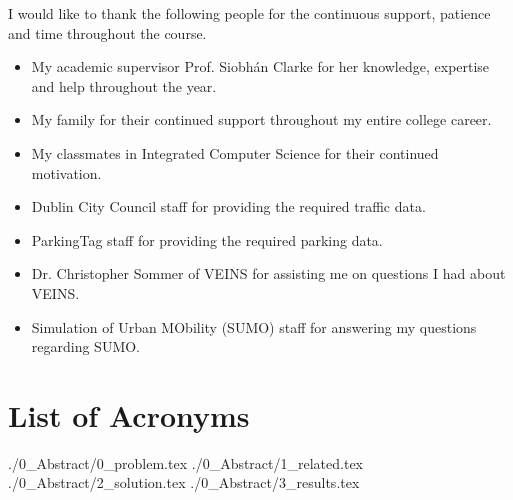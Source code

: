 \documentclass[a4paper, 11pt, oneside]{report}
\begin{document}
\thesistitlepage
\thesisdeclarationpage
\thesispermissionpage

\begin{thesisacknowledgments}
I would like to thank the following people for the continuous support, patience and time throughout the course.
\begin{itemize}
    \setlength\itemsep{0em}
    \item My academic supervisor Prof. Siobhán Clarke for her knowledge, expertise and help throughout the year.
    \item My family for their continued support throughout my entire college career.
    \item My classmates in Integrated Computer Science for their continued motivation.
    \item Dublin City Council staff for providing the required traffic data.
    \item ParkingTag staff for providing the required parking data.
    \item Dr. Christopher Sommer of VEINS for assisting me on questions I had about VEINS.
    \item Simulation of Urban MObility (SUMO) staff for answering my questions regarding SUMO.
\end{itemize}
\end{thesisacknowledgments}

\pagebreak

\section*{List of Acronyms}
\begin{acronym}
\end{acronym}

\begin{thesisabstract}
{./0_Abstract/0_problem.tex}
{./0_Abstract/1_related.tex}
{./0_Abstract/2_solution.tex}
{./0_Abstract/3_results.tex}
\end{thesisabstract}

\tableofcontents                                  %
\listoftables                                     %
\listoffigures                                    %
\printglossary[type=\acronymtype]
\end{document}

